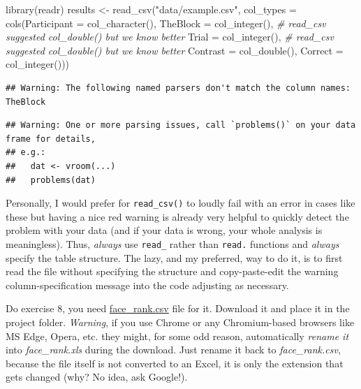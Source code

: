 \documentclass[
]{book}
\newenvironment{Shaded}{\begin{snugshade}}{\end{snugshade}}
\newcommand{\AttributeTok}[1]{\textcolor[rgb]{0.77,0.63,0.00}{#1}}
\newcommand{\CommentTok}[1]{\textcolor[rgb]{0.56,0.35,0.01}{\textit{#1}}}
\newcommand{\FunctionTok}[1]{\textcolor[rgb]{0.00,0.00,0.00}{#1}}
\newcommand{\NormalTok}[1]{#1}
\newcommand{\OtherTok}[1]{\textcolor[rgb]{0.56,0.35,0.01}{#1}}
\newcommand{\StringTok}[1]{\textcolor[rgb]{0.31,0.60,0.02}{#1}}
\begin{document}
\begin{Shaded}
\begin{Highlighting}[]
\FunctionTok{library}\NormalTok{(readr)}
\NormalTok{results }\OtherTok{\textless{}{-}} \FunctionTok{read\_csv}\NormalTok{(}\StringTok{"data/example.csv"}\NormalTok{, }
                    \AttributeTok{col\_types =} \FunctionTok{cols}\NormalTok{(}\AttributeTok{Participant =} \FunctionTok{col\_character}\NormalTok{(),}
                                     \AttributeTok{TheBlock =} \FunctionTok{col\_integer}\NormalTok{(), }\CommentTok{\# read\_csv suggested col\_double() but we know better}
                                     \AttributeTok{Trial =} \FunctionTok{col\_integer}\NormalTok{(), }\CommentTok{\# read\_csv suggested col\_double() but we know better}
                                     \AttributeTok{Contrast =} \FunctionTok{col\_double}\NormalTok{(),}
                                     \AttributeTok{Correct =} \FunctionTok{col\_integer}\NormalTok{()))}
\end{Highlighting}
\end{Shaded}

\begin{verbatim}
## Warning: The following named parsers don't match the column names: TheBlock
\end{verbatim}

\begin{verbatim}
## Warning: One or more parsing issues, call `problems()` on your data frame for details,
## e.g.:
##   dat <- vroom(...)
##   problems(dat)
\end{verbatim}

Personally, I would prefer for \texttt{read\_csv()} to loudly fail with an error in cases like these but having a nice red warning is already very helpful to quickly detect the problem with your data (and if your data is wrong, your whole analysis is meaningless). Thus, \emph{always} use \texttt{read\_} rather than \texttt{read.} functions and \emph{always} specify the table structure. The lazy, and my preferred, way to do it, is to first read the file without specifying the structure and copy-paste-edit the warning column-specification message into the code adjusting as necessary.

Do exercise 8, you need \href{data/face_rank.csv}{face\_rank.csv} file for it. Download it and place it in the project folder. \emph{Warning}, if you use Chrome or any Chromium-based browsers like MS Edge, Opera, etc. they might, for some odd reason, automatically \emph{rename it} into \emph{face\_rank.xls} during the download. Just rename it back to \emph{face\_rank.csv}, because the file itself is not converted to an Excel, it is only the extension that gets changed (why? No idea, ask Google!).
\end{document}
